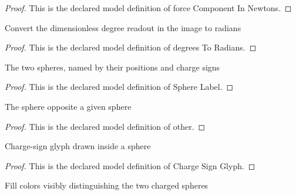 \begin{proof}
  This is the declared model definition of force Component In Newtons.
\end{proof}
\begin{definition}
  \label{def:physics:phyx-mini-0906:phyxminiproblems-problemphyxmini0906-degreestoradians}
  Convert the dimensionless degree readout in the image to radians
\end{definition}
\begin{proof}
  This is the declared model definition of degrees To Radians.
\end{proof}
\begin{definition}
  \label{def:physics:phyx-mini-0906:phyxminiproblems-problemphyxmini0906-spherelabel}
  The two spheres, named by their positions and charge signs
\end{definition}
\begin{proof}
  This is the declared model definition of Sphere Label.
\end{proof}
\begin{definition}[other]
  \label{def:physics:phyx-mini-0906:phyxminiproblems-problemphyxmini0906-spherelabel-other}
  The sphere opposite a given sphere
\end{definition}
\begin{proof}
  This is the declared model definition of other.
\end{proof}
\begin{definition}
  \label{def:physics:phyx-mini-0906:phyxminiproblems-problemphyxmini0906-chargesignglyph}
  Charge-sign glyph drawn inside a sphere
\end{definition}
\begin{proof}
  This is the declared model definition of Charge Sign Glyph.
\end{proof}
\begin{definition}
  \label{def:physics:phyx-mini-0906:phyxminiproblems-problemphyxmini0906-spherefillcolor}
  Fill colors visibly distinguishing the two charged spheres
\end{definition}
